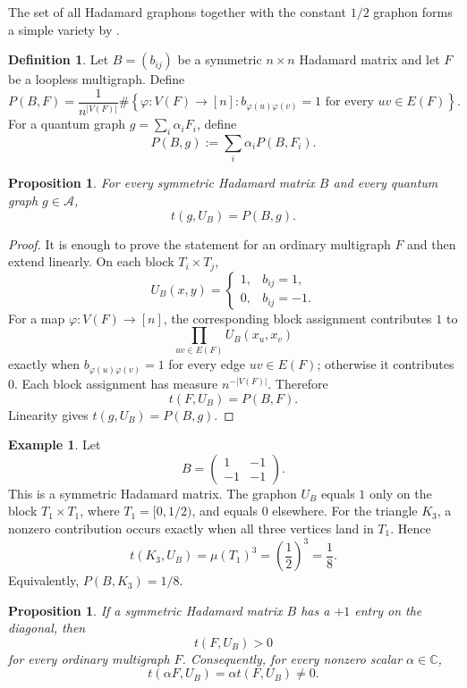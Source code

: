 \documentclass[a4paper,12pt]{article}
\let\cite\parencite
\newtheorem{proposition}[lemma]{Proposition}
\theoremstyle{definition}
\newtheorem{definition}[lemma]{Definition}
\newtheorem{example}[lemma]{Example}
\newcommand\cA{\mathcal{A}}
\newcommand\C{\mathbb{C}}
\begin{document}
The set of all Hadamard graphons together with the constant $1/2$ graphon forms a simple variety by \cite{hombook}.

\begin{definition}\label{def: hadamard probability}
Let $B=(b_{ij})$ be a symmetric $n\times n$ Hadamard matrix and let $F$ be a loopless multigraph. Define
\[
P(B,F)=
\frac{1}{n^{|V(F)|}}
\#\left\{
\varphi:V(F)\to[n]:
 b_{\varphi(u)\varphi(v)}=1\text{ for every }uv\in E(F)
\right\}.
\]
For a quantum graph $g=\sum_i\alpha_iF_i$, define
\[
    P(B,g):=\sum_i\alpha_iP(B,F_i).
\]
\end{definition}

\begin{proposition}\label{proposition: hadamard formula}
For every symmetric Hadamard matrix $B$ and every quantum graph $g\in\cA$,
\[
    t(g,U_B)=P(B,g).
\]
\end{proposition}

\begin{proof}
It is enough to prove the statement for an ordinary multigraph $F$ and then extend linearly. On each block $T_i\times T_j$,
\[
U_B(x,y)=
\begin{cases}
1, & b_{ij}=1,\\
0, & b_{ij}=-1.
\end{cases}
\]
For a map $\varphi:V(F)\to[n]$, the corresponding block assignment contributes $1$ to
\[
    \prod_{uv\in E(F)}U_B(x_u,x_v)
\]
exactly when $b_{\varphi(u)\varphi(v)}=1$ for every edge $uv\in E(F)$; otherwise it contributes $0$. Each block assignment has measure $n^{-|V(F)|}$. Therefore
\[
    t(F,U_B)=P(B,F).
\]
Linearity gives $t(g,U_B)=P(B,g)$.
\end{proof}

\begin{example}\label{example: triangle hadamard}
Let
\[
B=\begin{pmatrix}
1&-1\\
-1&-1
\end{pmatrix}.
\]
This is a symmetric Hadamard matrix. The graphon $U_B$ equals $1$ only on the block $T_1\times T_1$, where $T_1=[0,1/2)$, and equals $0$ elsewhere. For the triangle $K_3$, a nonzero contribution occurs exactly when all three vertices land in $T_1$. Hence
\[
    t(K_3,U_B)=\mu(T_1)^3=\left(\frac12\right)^3=\frac18.
\]
Equivalently, $P(B,K_3)=1/8$.
\end{example}

\begin{proposition}\label{proposition: positive diagonal}
If a symmetric Hadamard matrix $B$ has a $+1$ entry on the diagonal, then
\[
    t(F,U_B)>0
\]
for every ordinary multigraph $F$. Consequently, for every nonzero scalar $\alpha\in\C$,
\[
    t(\alpha F,U_B)=\alpha t(F,U_B)\neq0.
\]
\end{proposition}
\end{document}
